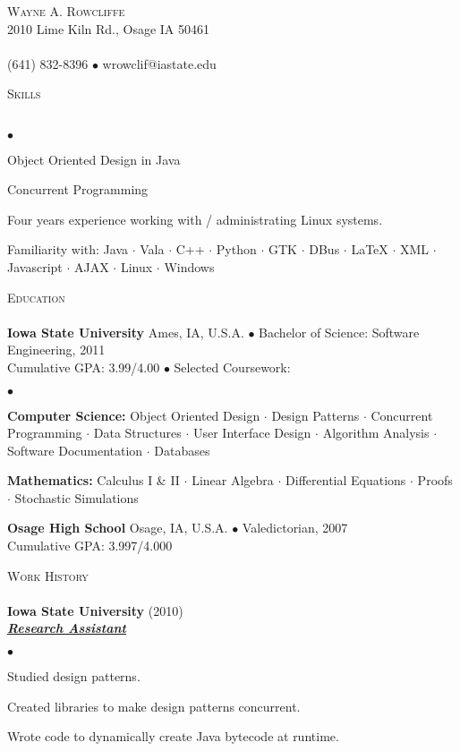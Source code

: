 \documentclass{article}
\newcommand{\lineunder} {
	\vspace*{-8pt} \\ \hspace*{-18pt} \hrulefill \\
}
\newcommand{\header}[1] {
	{\hspace*{-15pt}\vspace*{6pt} \textsc{#1}} \vspace*{-6pt} \lineunder
}
\newcommand{\employer}[3] {
	{ \textbf{#1} (#2)\\ \underline{\textbf{\emph{#3}}}\\  }
}
\newcommand{\contact}[3] {
	\vspace*{-8pt}\begin{center}{\LARGE \scshape {#1}}\\#2 \lineunder#3\end{center}\vspace*{-8pt}
}
\newenvironment{achievements} {
	\begin{list}{$\bullet$}
		{\topsep 0pt \itemsep -2pt}
	}{
		\vspace*{4pt}\end{list}
	}
\newcommand{\schoolwithcourses}[4]{
	\textbf{#1} #2 $\bullet$ #3\\
	#4 $\bullet$  Selected Coursework:\\
	\vspace*{5pt}
}
\newcommand{\school}[4] {
	\textbf{#1} #2 $\bullet$ #3\\
	#4 \\
	\vspace*{5pt}
}
\newcommand{\area}[1] {\textbf{#1:}}
\newcommand{\subject}[1] {#1 $\cdot$}
\newcommand{\lastsubject}[1] {#1}
\begin{document}
\small
\smallskip
\vspace*{-44pt}

\contact{Wayne A. Rowcliffe}
{2010 Lime Kiln Rd., Osage IA 50461}
{(641) 832-8396 $\bullet$ wrowclif@iastate.edu}%

\header{Skills}

	\begin{achievements}
		\item{Object Oriented Design in Java}
		\item{Concurrent Programming}
		\item{Four years experience working with / administrating Linux systems.}
		\item{Familiarity with:
			\subject{Java}
			\subject{Vala}
			\subject{C++}
			\subject{Python}
			\subject{GTK}
			\subject{DBus}
			\subject{\LaTeX{}}
			\subject{XML}
			\subject{Javascript}
			\subject{AJAX}
			\subject{Linux}
			\lastsubject{Windows}
		}

	\end{achievements}

\header{Education}

	\schoolwithcourses{Iowa State University}{Ames, IA, U.S.A.}{Bachelor of Science: Software Engineering, 2011}
	{Cumulative GPA: 3.99/4.00}
		\begin{achievements}
			\item{
				\area{Computer Science}
				\subject{Object Oriented Design}
				\subject{Design Patterns}
				\subject{Concurrent Programming}
				\subject{Data Structures}
				\subject{User Interface Design}
				\subject{Algorithm Analysis}
				\subject{Software Documentation}
				\lastsubject{Databases}
			}
			\item{
				\area{Mathematics}
				\subject{Calculus I \& II}
				\subject{Linear Algebra}
				\subject{Differential Equations}
				\subject{Proofs}
				\lastsubject{Stochastic Simulations}
			}
		\end{achievements}

	\school{Osage High School}{Osage, IA, U.S.A.}{Valedictorian, 2007}
	{Cumulative GPA: 3.997/4.000}

\header{Work History}

	\employer{Iowa State University}{2010}{Research Assistant}
		\begin{achievements}
			\item{Studied design patterns.}
			\item{Created libraries to make design patterns concurrent.}
			\item{Wrote code to dynamically create Java bytecode at runtime.}
		\end{achievements}
\end{document}
